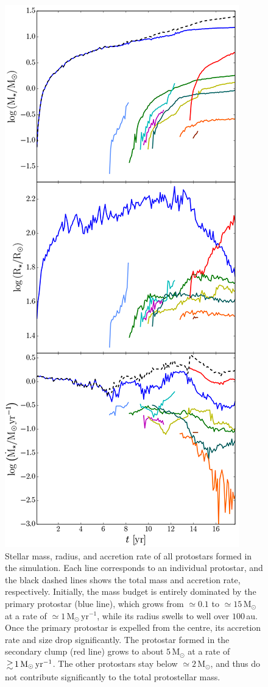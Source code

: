 \documentclass[useAMS,usenatbib]{mnras}
\newcommand{\msunyr}{\text{M}_\odot\,\text{yr}^{-1}}
\newcommand{\msun}{\text{M}_\odot}
\begin{document}
\begin{figure}
\begin{center}
\includegraphics[scale=0.86]{./f9.png}
\caption{Stellar mass, radius, and accretion rate of all protostars formed in the simulation. Each line corresponds to an individual protostar, and the black dashed lines shows the total mass and accretion rate, respectively. Initially, the mass budget is entirely dominated by the primary protostar (blue line), which grows from $\simeq 0.1$ to $\simeq 15\,\msun$ at a rate of $\simeq 1\,\msunyr$, while its radius swells to well over $100\,$au. Once the primary protostar is expelled from the centre, its accretion rate and size drop significantly. The protostar formed in the secondary clump (red line) grows to about $5\,\msun$ at a rate of $\ga 1\,\msunyr$. The other protostars stay below $\simeq 2\,\msun$, and thus do not contribute significantly to the total protostellar mass.}
\label{fig:protoproperties}
\end{center}
\end{figure}
\end{document}
